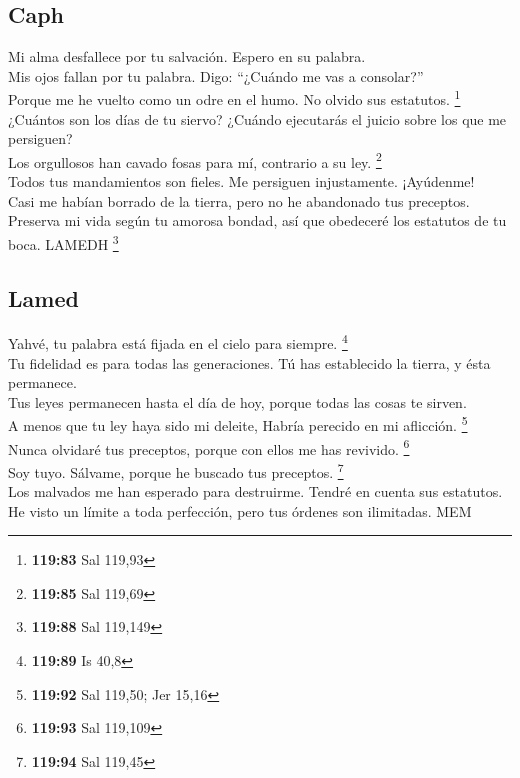 \hypertarget{caph}{%
\subsection{Caph}\label{caph}}

 Mi alma desfallece por tu salvación. Espero en su
palabra.\\
 Mis ojos fallan por tu palabra. Digo: ``¿Cuándo me vas a
consolar?''\\
 Porque me he vuelto como un odre en el humo. No olvido
sus estatutos. \footnote{\textbf{119:83} Sal 119,93}\\
 ¿Cuántos son los días de tu siervo? ¿Cuándo ejecutarás
el juicio sobre los que me persiguen?\\
 Los orgullosos han cavado fosas para mí, contrario a su
ley. \footnote{\textbf{119:85} Sal 119,69}\\
 Todos tus mandamientos son fieles. Me persiguen
injustamente. ¡Ayúdenme!\\
 Casi me habían borrado de la tierra, pero no he
abandonado tus preceptos.\\
 Preserva mi vida según tu amorosa bondad, así que
obedeceré los estatutos de tu boca. LAMEDH \footnote{\textbf{119:88} Sal
  119,149}

\hypertarget{lamed}{%
\subsection{Lamed}\label{lamed}}

 Yahvé, tu palabra está fijada en el cielo para siempre.
\footnote{\textbf{119:89} Is 40,8}\\
 Tu fidelidad es para todas las generaciones. Tú has
establecido la tierra, y ésta permanece.\\
 Tus leyes permanecen hasta el día de hoy, porque todas
las cosas te sirven.\\
 A menos que tu ley haya sido mi deleite, Habría perecido
en mi aflicción. \footnote{\textbf{119:92} Sal 119,50; Jer 15,16}\\
 Nunca olvidaré tus preceptos, porque con ellos me has
revivido. \footnote{\textbf{119:93} Sal 119,109}\\
 Soy tuyo. Sálvame, porque he buscado tus preceptos.
\footnote{\textbf{119:94} Sal 119,45}\\
 Los malvados me han esperado para destruirme. Tendré en
cuenta sus estatutos.\\
 He visto un límite a toda perfección, pero tus órdenes
son ilimitadas. MEM

